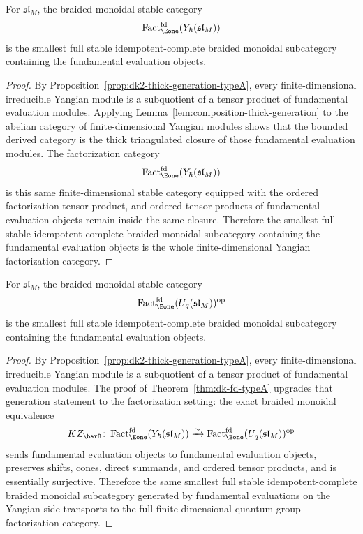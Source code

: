 \begin{lemma}
\label{lem:yangian-fd-fundamental-generation}
For $\mathfrak{sl}_M$, the braided monoidal stable category
\[
\operatorname{Fact}_{\Eone}^{\mathrm{fd}}(Y_\hbar(\mathfrak{sl}_M))
\]
is the smallest full stable idempotent-complete braided monoidal
subcategory containing the fundamental evaluation objects.
\end{lemma}

\begin{proof}
By Proposition~\ref{prop:dk2-thick-generation-typeA}, every
finite-dimensional irreducible Yangian module is a subquotient of a
tensor product of fundamental evaluation modules.  Applying
Lemma~\ref{lem:composition-thick-generation} to the abelian category of
finite-dimensional Yangian modules shows that the bounded derived
category is the thick triangulated closure of those fundamental
evaluation modules.  The factorization category
\[
\operatorname{Fact}_{\Eone}^{\mathrm{fd}}(Y_\hbar(\mathfrak{sl}_M))
\]
is this same finite-dimensional stable category equipped with the
ordered factorization tensor product, and ordered tensor products of
fundamental evaluation objects remain inside the same closure.
Therefore the smallest full stable idempotent-complete braided
monoidal subcategory containing the fundamental evaluation objects is
the whole finite-dimensional Yangian factorization category.
\end{proof}

\begin{lemma}
\label{lem:quantum-fd-fundamental-generation}
For $\mathfrak{sl}_M$, the braided monoidal stable category
\[
\operatorname{Fact}_{\Eone}^{\mathrm{fd}}(U_q(\mathfrak{sl}_M))^{\mathrm{op}}
\]
is the smallest full stable idempotent-complete braided monoidal
subcategory containing the fundamental evaluation objects.
\end{lemma}

\begin{proof}
By Proposition~\ref{prop:dk2-thick-generation-typeA}, every
finite-dimensional irreducible Yangian module is a subquotient of a
tensor product of fundamental evaluation modules.  The proof of
Theorem~\ref{thm:dk-fd-typeA} upgrades that generation statement to the
factorization setting: the exact braided monoidal equivalence
\[
KZ_{\barB}\colon
\operatorname{Fact}_{\Eone}^{\mathrm{fd}}(Y_\hbar(\mathfrak{sl}_M))
\xrightarrow{\sim}
\operatorname{Fact}_{\Eone}^{\mathrm{fd}}(U_q(\mathfrak{sl}_M))^{\mathrm{op}}
\]
sends fundamental evaluation objects to fundamental evaluation
objects, preserves shifts, cones, direct summands, and ordered tensor
products, and is essentially surjective.  Therefore the same smallest
full stable idempotent-complete braided monoidal subcategory generated
by fundamental evaluations on the Yangian side transports to the full
finite-dimensional quantum-group factorization category.
\end{proof}

